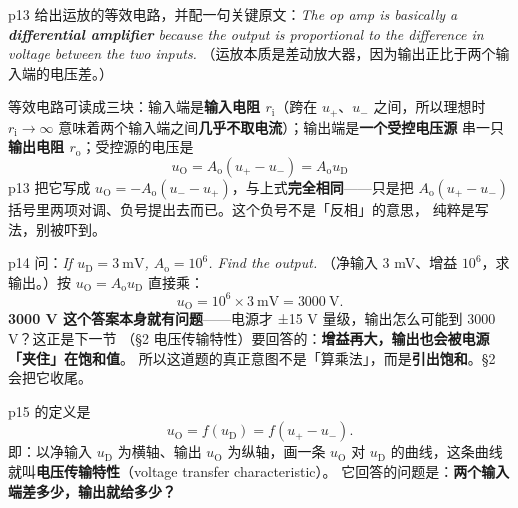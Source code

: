 \documentclass[11pt]{ctexart}
\begin{document}


p13 给出运放的等效电路，并配一句关键原文：\textit{The op amp is basically a \textbf{differential
amplifier} because the output is proportional to the difference in voltage between the two inputs.}
（运放本质是差动放大器，因为输出正比于两个输入端的电压差。）

等效电路可读成三块：输入端是\textbf{输入电阻 $r_{\mathrm{i}}$}（跨在 $u_+$、$u_-$ 之间，所以理想时
$r_{\mathrm{i}}\to\infty$ 意味着两个输入端之间\textbf{几乎不取电流}）；输出端是\textbf{一个受控电压源}
串一只\textbf{输出电阻 $r_{\mathrm{o}}$}；受控源的电压是
\[
\boxed{\;u_{\mathrm{O}}=A_{\mathrm{o}}(u_+-u_-)=A_{\mathrm{o}}u_{\mathrm{D}}\;}
\]
p13 把它写成 $u_{\mathrm{O}}=-A_{\mathrm{o}}(u_--u_+)$，与上式\textbf{完全相同}——只是把
$A_{\mathrm{o}}(u_+-u_-)$ 括号里两项对调、负号提出去而已。这个负号不是「反相」的意思，
纯粹是写法，别被吓到。



p14 问：\textit{If $u_{\mathrm{D}}=3\ \mathrm{mV}$, $A_{\mathrm{o}}=10^6$. Find the output.}
（净输入 3 mV、增益 $10^6$，求输出。）按 $u_{\mathrm{O}}=A_{\mathrm{o}}u_{\mathrm{D}}$ 直接乘：
\[
u_{\mathrm{O}}=10^6\times 3\ \mathrm{mV}=3000\ \mathrm{V}.
\]
\textbf{3000 V 这个答案本身就有问题}——电源才 ±15 V 量级，输出怎么可能到 3000 V？这正是下一节
（§2 电压传输特性）要回答的：\textbf{增益再大，输出也会被电源「夹住」在饱和值}。
所以这道题的真正意图不是「算乘法」，而是\textbf{引出饱和}。§2 会把它收尾。



p15 的定义是
\[
u_{\mathrm{O}}=f(u_{\mathrm{D}})=f(u_+-u_-) .
\]
即：以净输入 $u_{\mathrm{D}}$ 为横轴、输出 $u_{\mathrm{O}}$ 为纵轴，画一条 $u_{\mathrm{O}}$ 对
$u_{\mathrm{D}}$ 的曲线，这条曲线就叫\textbf{电压传输特性}（voltage transfer characteristic）。
它回答的问题是：\textbf{两个输入端差多少，输出就给多少？}
\end{document}
